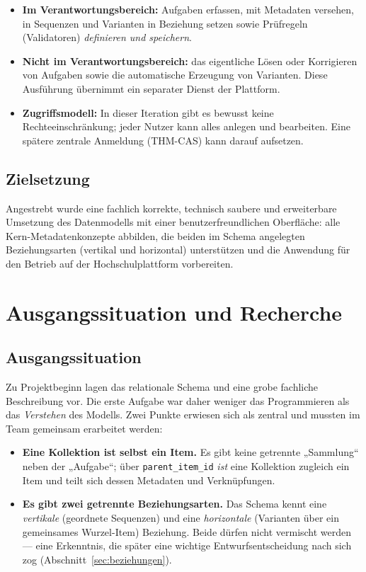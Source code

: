 \documentclass[11pt,a4paper]{article}
\begin{document}
\begin{itemize}
  \item \textbf{Im Verantwortungsbereich:} Aufgaben erfassen, mit Metadaten
  versehen, in Sequenzen und Varianten in Beziehung setzen sowie Prüfregeln
  (Validatoren) \emph{definieren und speichern}.
  \item \textbf{Nicht im Verantwortungsbereich:} das eigentliche Lösen oder
  Korrigieren von Aufgaben sowie die automatische Erzeugung von Varianten. Diese
  Ausführung übernimmt ein separater Dienst der Plattform.
  \item \textbf{Zugriffsmodell:} In dieser Iteration gibt es bewusst keine
  Rechteeinschränkung; jeder Nutzer kann alles anlegen und bearbeiten. Eine
  spätere zentrale Anmeldung (THM-CAS) kann darauf aufsetzen.
\end{itemize}

\subsection{Zielsetzung}
Angestrebt wurde eine fachlich korrekte, technisch saubere und erweiterbare
Umsetzung des Datenmodells mit einer benutzerfreundlichen Oberfläche: alle
Kern-Metadatenkonzepte abbilden, die beiden im Schema angelegten Beziehungsarten
(vertikal und horizontal) unterstützen und die Anwendung für den Betrieb auf der
Hochschulplattform vorbereiten.

\section{Ausgangssituation und Recherche}

\subsection{Ausgangssituation}
Zu Projektbeginn lagen das relationale Schema und eine grobe fachliche
Beschreibung vor. Die erste Aufgabe war daher weniger das Programmieren als das
\emph{Verstehen} des Modells. Zwei Punkte erwiesen sich als zentral und mussten
im Team gemeinsam erarbeitet werden:

\begin{itemize}
  \item \textbf{Eine Kollektion ist selbst ein Item.} Es gibt keine getrennte
  „Sammlung`` neben der „Aufgabe``; über \texttt{parent\_item\_id} \emph{ist}
  eine Kollektion zugleich ein Item und teilt sich dessen Metadaten und
  Verknüpfungen.
  \item \textbf{Es gibt zwei getrennte Beziehungsarten.} Das Schema kennt eine
  \emph{vertikale} (geordnete Sequenzen) und eine \emph{horizontale} (Varianten
  über ein gemeinsames Wurzel-Item) Beziehung. Beide dürfen nicht vermischt
  werden --- eine Erkenntnis, die später eine wichtige Entwurfsentscheidung nach
  sich zog (Abschnitt~\ref{sec:beziehungen}).
\end{itemize}
\end{document}
